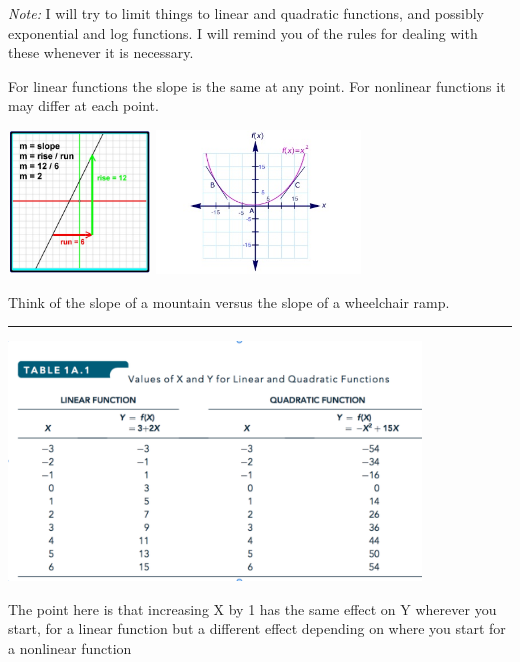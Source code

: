 \documentclass[]{article}
\begin{document}
\emph{Note:} I will try to limit things to linear and quadratic functions, and possibly exponential and log functions.
I will remind you of the rules for dealing with these whenever it is necessary.

\bigskip

For linear functions the slope is the same at any point. For nonlinear functions it may differ at each point.

\includegraphics[height=1.5in]{picsfigs/linearslope.jpg}
\includegraphics[height=1.5in]{picsfigs/nonlinearslope.jpg}

Think of the slope of a mountain versus the slope of a wheelchair ramp.

\begin{center}\rule{0.5\linewidth}{\linethickness}\end{center}

\includegraphics[height=2.5in]{picsfigs/linearquadratic.png}

The point here is that increasing X by 1 has the same effect on Y wherever you start, for a linear function
but a different effect depending on where you start for a nonlinear function
\end{document}
